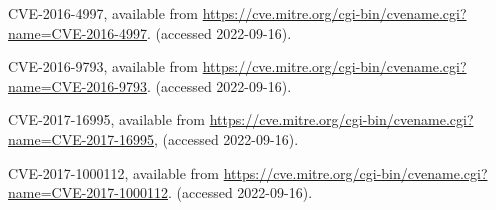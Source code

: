 \documentclass[paper]{ieice}
\begin{document}
\begin{thebibliography}{99}
  CVE-2016-4997,
  available from \url{https://cve.mitre.org/cgi-bin/cvename.cgi?name=CVE-2016-4997}. (accessed 2022-09-16).
  
  CVE-2016-9793,
  available from \url{https://cve.mitre.org/cgi-bin/cvename.cgi?name=CVE-2016-9793}. (accessed 2022-09-16).

  CVE-2017-16995, available from \url{https://cve.mitre.org/cgi-bin/cvename.cgi?name=CVE-2017-16995}, (accessed 2022-09-16).

  CVE-2017-1000112,
  available from \url{https://cve.mitre.org/cgi-bin/cvename.cgi?name=CVE-2017-1000112}. (accessed 2022-09-16).
    
  
  






\end{thebibliography}
\end{document}

